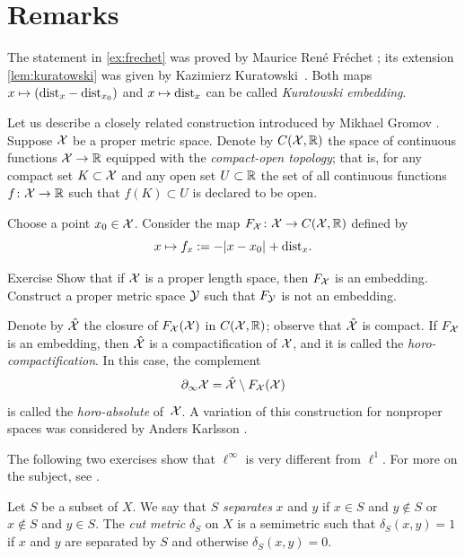 \section{Remarks}

The statement in \ref{ex:frechet} was proved by Maurice René Fréchet \cite[p. 162]{frechet-1910};
its extension \ref{lem:kuratowski} was given by Kazimierz Kuratowski~\cite{kuratowski}.
Both maps $x\mapsto (\mathrm{dist}_x-\mathrm{dist}_{x_0})$ and $x\mapsto \mathrm{dist}_x$ can be called \emph{Kuratowski embedding}.

\medskip

Let us describe a closely related construction introduced by Mikhael Gromov \cite{gromov-1981-hyperbolic}.
Suppose $\mathcal{X}$ be a proper metric space.
Denote by $C(\mathcal{X},\mathbb{R})$ the space of continuous functions $\mathcal{X}\to \mathbb{R}$
equipped with the \emph{compact-open topology};
that is, for any compact set $K\subset \mathcal{X}$ and any open set $U\subset \mathbb{R}$
the set of all continuous functions $f\colon \mathcal{X}\to \mathbb{R}$ such that $f(K)\subset U$
is declared to be open.

Choose a point $x_0\in \mathcal{X}$.
Consider the map $F_{\mathcal{X}}\colon\mathcal{X}\to C(\mathcal{X},\mathbb{R})$
defined by
\[x\mapsto f_x\df -\dist{x}{x_0}{}+\distfun_x.\]

\begin{thm}{Exercise}\label{ex:horobry}
Show that if $\mathcal{X}$ is a proper length space, then $F_{\mathcal{X}}$ is an embedding.
Construct a proper metric space $\mathcal{Y}$ such that $F_{\mathcal{Y}}$ 
is not an embedding.

\end{thm}

Denote by $\hat{\mathcal{X}}$ 
the closure of $F_{\mathcal{X}}(\mathcal{X})$ in $C(\mathcal{X},\mathbb{R})$;
observe that $\hat {\mathcal{X}}$ is compact.
If $F_{\mathcal{X}}$ is an embedding, 
then $\hat {\mathcal{X}}$ is a compactification of $\mathcal{X}$,
and it is called the \emph{horo-compactification}.
In this case, the complement 
\[\partial_\infty \spc{X}\z=\hat {\spc{X}}\setminus F_{\spc{X}}(\spc{X})\] 
is called the {}\emph{horo-absolute} of~$\mathcal{X}$.
A variation of this construction for nonproper spaces was considered by Anders Karlsson \cite{karlsson-2023}.


\medskip

The following two exercises show that $\ell^\infty$ is very different from $\ell^1$.
For more on the subject, see \cite{deza-laurent}.

Let $S$ be a subset of $X$.
We say that $S$ \emph{separates} $x$ and $y$ if 
$x\in S$ and $y\notin S$ or $x\notin S$ and $y\in S$.
The \emph{cut metric} $\delta_S$ on $X$ is a semimetric such that $\delta_S(x, y) = 1$ if $x$ and $y$ are separated
by $S$ and otherwise $\delta_S(x, y) = 0$.


